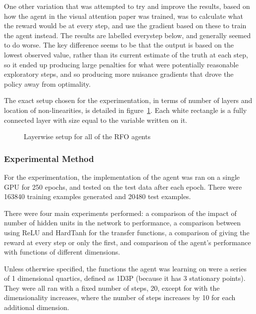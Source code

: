 One other variation that was attempted to try and improve the results, based on how the agent in the visual attention paper \cite{RVA} was trained, was to calculate what the reward would be at every step, and use the gradient based on these to train the agent instead. The results are labelled everystep below, and generally seemed to do worse. The key difference seems to be that the output is based on the lowest observed value, rather than its current estimate of the truth at each step, so it ended up producing large penalties for what were potentially reasonable exploratory steps, and so producing more nuisance gradients that drove the policy away from optimality.

The exact setup chosen for the experimentation, in terms of number of layers and location of non-linearities, is detailed in figure~\ref{fig:exactsetup}. Each white rectangle is a fully connected layer with size equal to the variable written on it. 
\begin{figure}
\centering

\caption{Layerwise setup for all of the RFO agents}
\label{fig:exactsetup}
\end{figure}



\subsubsection{Experimental Method}


For the experimentation, the implementation of the agent was ran on a single GPU for 250 epochs, and tested on the test data after each epoch. There were  163840 training examples generated and 20480 test examples. 

There were four main experiments performed: a comparison of the impact of number of hidden units in the network to performance, a comparison between using ReLU and HardTanh for the transfer functions, a comparison of giving the reward at every step or only the first, and comparison of the agent's performance with functions of different dimensions.

Unless otherwise specified, the functions the agent was learning on were a series of 1 dimensional quartics, defined as 1D3P (because it has 3 stationary points). They were all ran with a fixed number of steps, 20, except for with the dimensionality increases, where the number of steps increases by 10 for each additional dimension.

